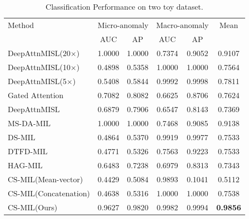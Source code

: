\documentclass[times,twocolumn,final]{elsarticle}
\begin{document}
\begin{table}[t]
\caption{Classification Performance on two toy dataset.}
\centering
\scriptsize
\setlength{\tabcolsep}{1mm}
\renewcommand\arraystretch{1}
\begin{tabular}{l|cc|cc|c}
\toprule
\multirow{1}{0.8in}{Method} & \multicolumn{2}{c}{Micro-anomaly}  & \multicolumn{2}{c}{Macro-anomaly} & \multirow{1}{0.3in}{Mean}\\
\cmidrule(lr){2-3}
\cmidrule(lr){4-5}
& AUC & AP & AUC & AP\\
\midrule
DeepAttnMISL(20$\times$)~\citep{yao2020whole}  &  1.0000 & 1.0000 &  0.7374& 0.9052 & 0.9107\\
DeepAttnMISL(10$\times$)~\citep{yao2020whole}  &  0.4898 & 0.5358 &  1.0000 & 1.0000 & 0.7564\\
DeepAttnMISL(5$\times$)~\citep{yao2020whole}  &  0.5408 & 0.5844 & 0.9992& 0.9998 & 0.7811\\
\midrule
Gated Attention~\citep{ilse2018attention}  & 0.7082 & 0.8082 & 0.6625& 0.8706 & 0.7624\\
DeepAttnMISL~\citep{yao2020whole} &  0.6879 & 0.7906 &  0.6547& 0.8143 & 0.7369\\
MS-DA-MIL~\citep{Hashimoto_2020_CVPR} & 1.0000 &1.0000 &   0.7468& 0.9085 & 0.9138 \\
DS-MIL~\citep{Li_2021_CVPR} & 0.4864& 0.5370 &   0.9919& 0.9977 & 0.7533\\
DTFD-MIL~\citep{zhang2022dtfd} &  0.4771& 0.5326 &  0.7563& 0.9223 & 0.7533\\
HAG-MIL~\citep{xiong2023diagnose} &  0.6483 & 0.7238 & 0.6979  & 0.8313 & 0.7343\\
\midrule
CS-MIL(Mean-vector) & 0.4429 & 0.5084 &  0.9893
& 0.1041 & 0.5112 \\
CS-MIL(Concatenation) & 0.4638 & 0.5316 &  1.0000
& 1.0000 & 0.7538 \\
CS-MIL(Ours) & 0.9627 & 0.9820 & 0.9982 &0.9994 & \textbf{0.9856}\\
\bottomrule
\end{tabular}
\label{tab:ablation1}
\end{table}
\end{document}
